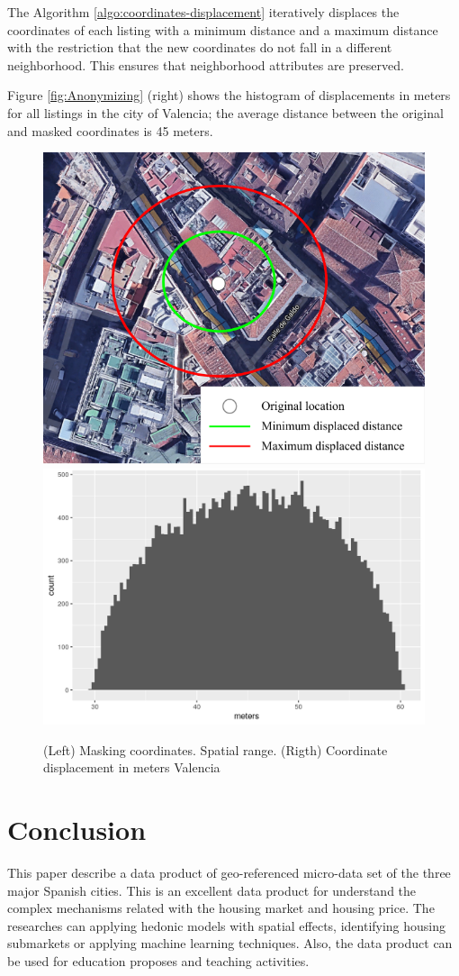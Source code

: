 \documentclass[Royal,times,sageh]{sagej}
\begin{document}
The Algorithm \ref{algo:coordinates-displacement} iteratively displaces
the coordinates of each listing with a minimum distance and a maximum
distance with the restriction that the new coordinates do not fall in a
different neighborhood. This ensures that neighborhood attributes are
preserved.

Figure \ref{fig:Anonymizing} (right) shows the histogram of
displacements in meters for all listings in the city of Valencia; the
average distance between the original and masked coordinates is 45
meters.

\begin{figure}

{\centering \includegraphics[width=0.29\linewidth,height=0.2\textheight]{EPB_files/points-moved-image} \includegraphics[width=0.37\linewidth,height=0.2\textheight]{EPB_files/coordinates-valencia} 

}

\caption{\label{fig:Anonymizing}(Left) Masking coordinates. Spatial range. (Rigth) Coordinate displacement in meters Valencia}\label{fig:unnamed-chunk-2}
\end{figure}

\hypertarget{conclusion}{%
\section{Conclusion}\label{conclusion}}

This paper describe a data product of geo-referenced micro-data set of
the three major Spanish cities. This is an excellent data product for
understand the complex mechanisms related with the housing market and
housing price. The researches can applying hedonic models with spatial
effects, identifying housing submarkets or applying machine learning
techniques. Also, the data product can be used for education proposes
and teaching activities.
\end{document}
